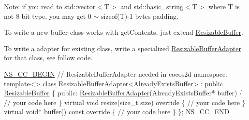 Note\+: if you read to std\+::vector$<$\+T$>$ and std\+::basic\+\_\+string$<$\+T$>$ where T is not 8 bit type, you may get 0 $\sim$ sizeof(\+T)-\/1 bytes padding.


\begin{DoxyItemize}
\item To write a new buffer class works with get\+Contents, just extend \hyperlink{classResizableBuffer}{Resizable\+Buffer}.
\item To write a adapter for existing class, write a specialized \hyperlink{classResizableBufferAdapter}{Resizable\+Buffer\+Adapter} for that class, see follow code.
\end{DoxyItemize}


\begin{DoxyCode}
\hyperlink{namespaceNS__CC__BEGIN}{NS\_CC\_BEGIN} \textcolor{comment}{// ResizableBufferAdapter needed in cocos2d namespace.}
\textcolor{keyword}{template}<>
\textcolor{keyword}{class }\hyperlink{classResizableBufferAdapter}{ResizableBufferAdapter}<AlreadyExistsBuffer> : \textcolor{keyword}{public} 
      \hyperlink{classResizableBuffer}{ResizableBuffer} \{
\textcolor{keyword}{public}:
    \hyperlink{classResizableBufferAdapter}{ResizableBufferAdapter}(AlreadyExistsBuffer* buffer)  \{
        \textcolor{comment}{// your code here}
    \}
    \textcolor{keyword}{virtual} \textcolor{keywordtype}{void} resize(\textcolor{keywordtype}{size\_t} size)\textcolor{keyword}{ override  }\{
        \textcolor{comment}{// your code here}
    \}
    \textcolor{keyword}{virtual} \textcolor{keywordtype}{void}* buffer()\textcolor{keyword}{ const override }\{
        \textcolor{comment}{// your code here}
    \}
\};
NS\_CC\_END
\end{DoxyCode}




